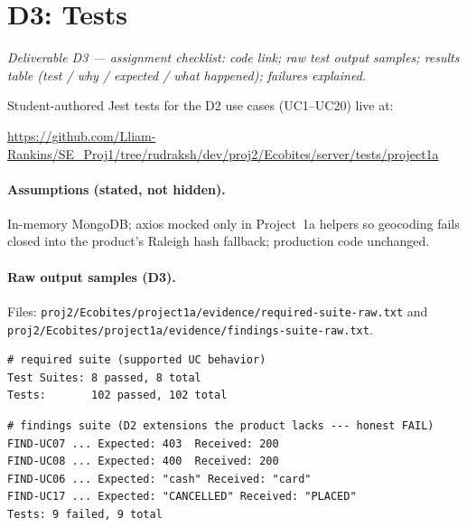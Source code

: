 
\section{D3: Tests}
\label{sec:d3}
\textit{Deliverable D3 --- assignment checklist: code link; raw test output samples;
results table (test / why / expected / what happened); failures explained.}

Student-authored Jest tests for the D2 use cases (UC1--UC20) live at:

\url{https://github.com/Lliam-Rankins/SE_Proj1/tree/rudraksh/dev/proj2/Ecobites/server/tests/project1a}

\paragraph{Assumptions (stated, not hidden).}
In-memory MongoDB; axios mocked only in Project~1a helpers so geocoding fails closed
into the product's Raleigh hash fallback; production code unchanged.

\paragraph{Raw output samples (D3).}
Files:
\texttt{proj2/Ecobites/project1a/evidence/required-suite-raw.txt} and
\texttt{proj2/Ecobites/project1a/evidence/findings-suite-raw.txt}.

\begin{verbatim}
# required suite (supported UC behavior)
Test Suites: 8 passed, 8 total
Tests:       102 passed, 102 total
\end{verbatim}

\begin{verbatim}
# findings suite (D2 extensions the product lacks --- honest FAIL)
FIND-UC07 ... Expected: 403  Received: 200
FIND-UC08 ... Expected: 400  Received: 200
FIND-UC06 ... Expected: "cash" Received: "card"
FIND-UC17 ... Expected: "CANCELLED" Received: "PLACED"
Tests: 9 failed, 9 total
\end{verbatim}

